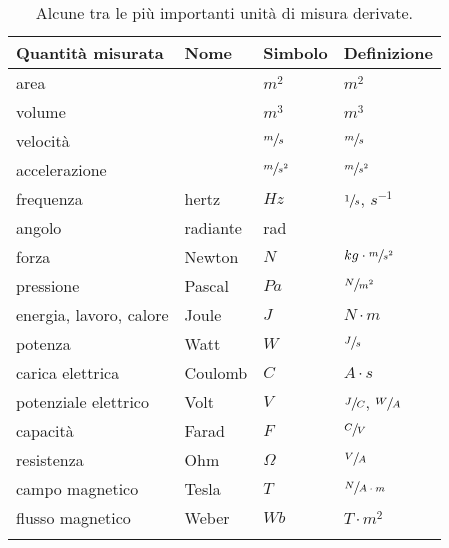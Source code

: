\documentclass[a4paper,11pt,italian]{article}
\begin{document}
\begin{description}
  \begin{table}[htp]\centering
    \begin{tabular}{llll}\toprule
    \textbf{Quantità misurata}& \textbf{Nome} & \textbf{Simbolo} & \textbf{Definizione}             \\\midrule
    area                      &           & $ m^2 $           & $ m^2 $                             \\\addlinespace[.2em]
    volume                    &           & $ m^3 $           & $ m^3 $                             \\\addlinespace[.2em]
    velocità                  &           & $ \sfrac{m}{s} $  & $ \sfrac{m}{s} $                    \\\addlinespace[.2em]
    accelerazione             &           & $ \sfrac{m}{s^2} $& $ \sfrac{m}{s^2} $                  \\\addlinespace[.2em]
    frequenza                 & hertz     & $ Hz $            & $ \sfrac{1}{s} $, $ s^{-1} $        \\\addlinespace[.2em]
    angolo                    & radiante  & rad               &                                     \\\addlinespace[.2em]
    forza                     & Newton    & $ N $             & $ kg \cdot \sfrac{m}{s^2} $         \\\addlinespace[.2em]
    pressione                 & Pascal    & $ Pa $            & $ \sfrac{N}{m^2} $                  \\\addlinespace[.2em]
    energia, lavoro, calore   & Joule     & $ J $             & $ N \cdot m $                       \\\addlinespace[.2em]
    potenza                   & Watt      & $ W $             & $ \sfrac{J}{s} $                    \\\addlinespace[.2em]
    carica elettrica          & Coulomb   & $ C $             & $ A \cdot s $                       \\\addlinespace[.2em]
    potenziale elettrico      & Volt      & $ V $             & $ \sfrac{J}{C} $, $ \sfrac{W}{A} $  \\\addlinespace[.2em]
    capacità                  & Farad     & $ F $             & $ \sfrac{C}{V} $                    \\\addlinespace[.2em]
    resistenza                & Ohm       & $ \Omega $        & $ \sfrac{V}{A} $                    \\\addlinespace[.2em]
    campo magnetico           & Tesla     & $ T $             & $ \sfrac{N}{A \cdot m} $            \\\addlinespace[.2em]
    flusso magnetico          & Weber     & $ Wb $            & $ T \cdot m^2 $                     \\\addlinespace[.2em]
    \bottomrule
  \end{tabular}
  \caption{Alcune tra le più importanti unità di misura derivate.}
  \label{tab:udmderivate}
  \end{table}
  

\end{description}
\end{document}
